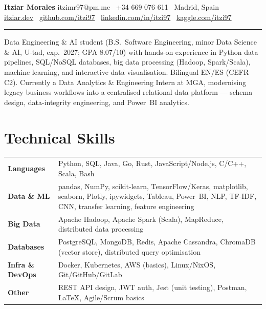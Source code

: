 \documentclass[10pt,a4paper]{article}
\begin{document}
{\LARGE\bfseries Itziar Morales}\hfill
{\small itzimr97@pm.me \textbar\ +34 669 076 611 \textbar\ Madrid, Spain}\\
{\small
  \href{https://itziar.dev}{itziar.dev} \textbar\
  \href{https://github.com/itzi97}{github.com/itzi97} \textbar\
  \href{https://www.linkedin.com/in/itzi97}{linkedin.com/in/itzi97} \textbar\
  \href{https://www.kaggle.com/itzi97}{kaggle.com/itzi97}
}
\vspace{3pt}\hrule\vspace{5pt}

{\small
Data Engineering \& AI student (B.S.~Software Engineering, minor Data Science \& AI, U-tad, exp.\ 2027;
GPA 8.07/10) with hands-on experience in Python data pipelines, SQL/NoSQL databases, big data processing
(Hadoop, Spark/Scala), machine learning, and interactive data visualisation.
Bilingual EN/ES (CEFR C2). Currently a Data Analytics \& Engineering Intern at MGA, modernising legacy
business workflows into a centralised relational data platform --- schema design, data-integrity
engineering, and Power~BI analytics.
}
\vspace{3pt}

\section{Technical Skills}
{\small
\begin{tabularx}{\linewidth}{@{} l X @{}}
  \textbf{Languages} &
    Python, SQL, Java, Go, Rust, JavaScript/Node.js, C/C++, Scala, Bash \\
  \textbf{Data \& ML} &
    pandas, NumPy, scikit-learn, TensorFlow/Keras, matplotlib, seaborn,
    Plotly, ipywidgets, Tableau, Power~BI, NLP, TF-IDF, CNN, transfer learning, feature engineering \\
  \textbf{Big Data} &
    Apache Hadoop, Apache Spark (Scala), MapReduce, distributed data processing \\
  \textbf{Databases} &
    PostgreSQL, MongoDB, Redis, Apache Cassandra, ChromaDB (vector store), distributed query optimisation \\
  \textbf{Infra \& DevOps} &
    Docker, Kubernetes, AWS (basics), Linux/NixOS, Git/GitHub/GitLab \\
  \textbf{Other} &
    REST API design, JWT auth, Jest (unit testing), Postman, \LaTeX, Agile/Scrum basics \\
\end{tabularx}
}
\end{document}
